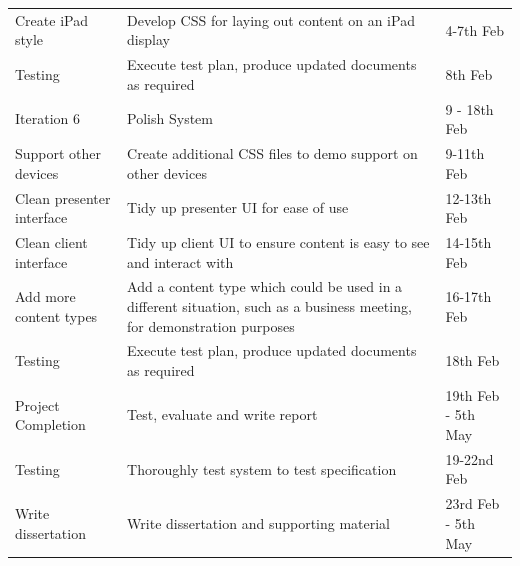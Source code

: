 \documentclass[a4papert,11pt,notitlepage]{ltxdoc}
\begin{document}
\begin{longtable}{l p{7cm} l}
Create iPad style & Develop CSS for laying out content on an iPad display & 4-7th Feb \\
Testing & Execute test plan, produce updated documents as required & 8th Feb \\[1cm]
\hline
Iteration 6 & Polish System & 9 - 18th Feb \\
\hline
Support other devices & Create additional CSS files to demo support on other devices & 9-11th Feb \\
Clean presenter interface & Tidy up presenter UI for ease of use & 12-13th Feb \\
Clean client interface & Tidy up client UI to ensure content is easy to see and interact with & 14-15th Feb \\
Add more content types & Add a content type which could be used in a different situation, such as a business meeting, for demonstration purposes & 16-17th Feb \\
Testing & Execute test plan, produce updated documents as required & 18th Feb \\[1cm]
\hline
Project Completion & Test, evaluate and write report & 19th Feb - 5th May \\
\hline
Testing & Thoroughly test system to test specification & 19-22nd Feb \\
Write dissertation & Write dissertation and supporting material & 23rd Feb - 5th May \\
\end{longtable}


\end{document}
